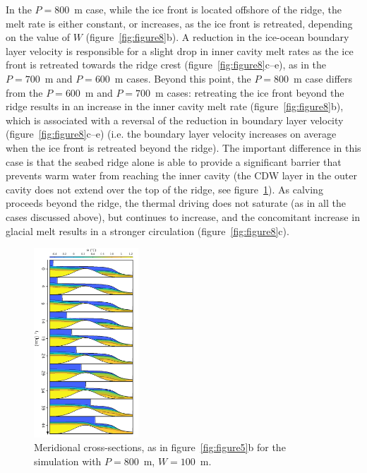 \documentclass[draft]{agujournal2019}
\begin{document}
In the $P=800$~m case, while the ice front is located offshore of the ridge, the melt rate is either constant, or increases, as the ice front is retreated, depending on the value of $W$ (figure~\ref{fig:figure8}b). A reduction in the ice-ocean boundary layer velocity is responsible for a slight drop in inner cavity melt rates as the ice front is retreated towards the ridge crest (figure~\ref{fig:figure8}c--e), as in the $P=700$~m and $P=600$~m cases. Beyond this point, the $P=800$~m case differs from the $P = 600$~m and $P = 700$~m cases: retreating the ice front beyond the ridge results in an increase in the inner cavity melt rate (figure~\ref{fig:figure8}b), which is associated with a reversal of the reduction in boundary layer velocity (figure~\ref{fig:figure8}c--e) (i.e. the boundary layer velocity increases on average when the ice front is retreated beyond the ridge). The important difference in this case is that the seabed ridge alone is able to provide a significant barrier that prevents warm water from reaching the inner cavity (the CDW layer in the outer cavity does not extend over the top of the ridge, see figure~\ref{fig:figure9}). As calving proceeds beyond the ridge, the thermal driving does not saturate (as in all the cases discussed above), but continues to increase, and the concomitant increase in glacial melt results in a stronger circulation (figure~\ref{fig:figure8}c).

\begin{figure}
    \centering
    \includegraphics[width = 0.35\textwidth]{../make_figures/plots/figure9.pdf}
    \caption{Meridional cross-sections, as in figure~\ref{fig:figure5}b for the simulation with $P=800$~m, $W=100$~m. }
    \label{fig:figure9}
\end{figure}
\end{document}
